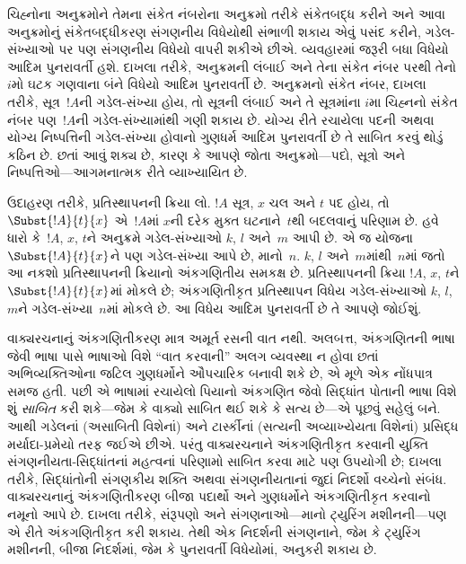 ચિહ્નોના અનુક્રમોને તેમના સંકેત નંબરોના
અનુક્રમો તરીકે સંકેતબદ્ધ કરીને અને આવા
અનુક્રમોનું સંકેતબદ્ધીકરણ સંગણનીય વિધેયોથી
સંભાળી શકાય એવું પસંદ કરીને, ગડેલ-સંખ્યાઓ
પર પણ સંગણનીય વિધેયો વાપરી શકીએ છીએ.
વ્યવહારમાં જરૂરી બધા વિધેયો આદિમ
પુનરાવર્તી હશે. દાખલા તરીકે, અનુક્રમની
લંબાઈ અને તેના સંકેત નંબર પરથી તેનો
$i$મો ઘટક ગણવાના બંને વિધેયો આદિમ
પુનરાવર્તી છે. અનુક્રમનો સંકેત નંબર,
દાખલા તરીકે, સૂત્ર~$!A$ની
ગડેલ-સંખ્યા હોય, તો સૂત્રની
લંબાઈ અને તે સૂત્રમાંના $i$મા ચિહ્નનો સંકેત
નંબર પણ~$!A$ની ગડેલ-સંખ્યામાંથી
ગણી શકાય છે. યોગ્ય રીતે રચાયેલા પદની
અથવા યોગ્ય નિષ્પત્તિની ગડેલ-સંખ્યા
હોવાનો ગુણધર્મ આદિમ પુનરાવર્તી છે તે
સાબિત કરવું થોડું કઠિન છે. છતાં આવું
શક્ય છે, કારણ કે આપણે જોતા અનુક્રમો—પદો,
સૂત્રો અને નિષ્પત્તિઓ—આગમનાત્મક
રીતે વ્યાખ્યાયિત છે.

ઉદાહરણ તરીકે, પ્રતિસ્થાપનની ક્રિયા લો.
$!A$ સૂત્ર, $x$ ચલ અને $t$ પદ હોય,
તો~$\Subst{!A}{t}{x}$ એ~$!A$માં
$x$ની દરેક મુક્ત ઘટનાને~$t$થી
બદલવાનું પરિણામ છે. હવે ધારો કે~$!A$,
$x$, $t$ને અનુક્રમે ગડેલ-સંખ્યાઓ
$k$, $l$ અને~$m$ આપી છે. એ જ
યોજના~$\Subst{!A}{t}{x}$ને પણ
ગડેલ-સંખ્યા આપે છે, માનો~$n$.
$k$, $l$ અને~$m$માંથી~$n$માં
જતો આ નકશો પ્રતિસ્થાપનની ક્રિયાનો
અંકગણિતીય સમકક્ષ છે. પ્રતિસ્થાપનની
ક્રિયા $!A$, $x$, $t$ને
$\Subst{!A}{t}{x}$માં મોકલે છે;
અંકગણિતીકૃત પ્રતિસ્થાપન વિધેય
ગડેલ-સંખ્યાઓ $k$, $l$, $m$ને
ગડેલ-સંખ્યા~$n$માં મોકલે છે.
આ વિધેય આદિમ પુનરાવર્તી છે તે આપણે
જોઈશું.

વાક્યરચનાનું અંકગણિતીકરણ માત્ર અમૂર્ત
રસની વાત નથી. અલબત્ત, અંકગણિતની ભાષા
જેવી ભાષા પાસે ભાષાઓ વિશે ``વાત કરવાની''
અલગ વ્યવસ્થા ન હોવા છતાં અભિવ્યક્તિઓના
જટિલ ગુણધર્મોને ઔપચારિક બનાવી શકે છે,
એ મૂળે એક નોંધપાત્ર સમજ હતી. પછી એ
ભાષામાં રચાયેલો પિયાનો અંકગણિત જેવો
સિદ્ધાંત પોતાની ભાષા વિશે શું \emph{સાબિત}
કરી શકે—જેમ કે વાક્યો સાબિત
થઈ શકે કે સત્ય છે—એ પૂછવું સહેલું બને.
આથી ગડેલનાં (અસાબિતી વિશેનાં) અને
ટાર્સ્કીનાં (સત્યની અવ્યાખ્યેયતા વિશેનાં)
પ્રસિદ્ધ મર્યાદા-પ્રમેયો તરફ જઈએ છીએ.
પરંતુ વાક્યરચનાને અંકગણિતીકૃત કરવાની
યુક્તિ સંગણનીયતા-સિદ્ધાંતનાં મહત્વનાં
પરિણામો સાબિત કરવા માટે પણ ઉપયોગી છે;
દાખલા તરીકે, સિદ્ધાંતોની સંગણકીય શક્તિ
અથવા સંગણનીયતાનાં જુદાં નિદર્શો વચ્ચેનો
સંબંધ. વાક્યરચનાનું અંકગણિતીકરણ બીજા
પદાર્થો અને ગુણધર્મોને અંકગણિતીકૃત કરવાનો
નમૂનો આપે છે. દાખલા તરીકે, સંરૂપણો
અને સંગણનાઓ—માનો ટ્યુરિંગ મશીનની—પણ
એ રીતે અંકગણિતીકૃત કરી શકાય. તેથી
એક નિદર્શની સંગણનાને, જેમ કે ટ્યુરિંગ
મશીનની, બીજા નિદર્શમાં, જેમ કે પુનરાવર્તી
વિધેયોમાં, અનુકરી શકાય છે.
\endgroup


\begingroup
\makeatletter{}\makeatother

\label{guunit:OLP-0282}


